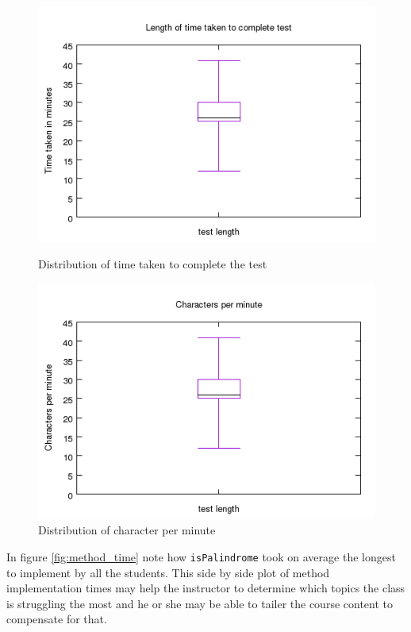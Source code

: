 \documentclass[twocolumn]{article}
\begin{document}
\begin{figure}[h!bt]
\centering
\includegraphics[width=\linewidth]{figures/test_length}
\caption{Distribution of time taken to complete the test}
\label{fig:test_len}
\includegraphics[width=\linewidth]{figures/char_per_minute}
\caption{Distribution of character per minute}
\label{fig:chars}
\end{figure}

In figure \ref{fig:method_time} note how \texttt{isPalindrome} took on average
the longest to implement by all the students. This side by side plot of method
implementation times may help the instructor to determine which topics the
class is struggling the most and he or she may be able to tailer the course
content to compensate for that.
\end{document}
